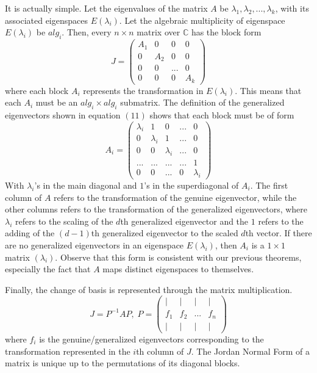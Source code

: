   It is actually simple. Let the eigenvalues of the matrix $A$ be $\lambda_1, \lambda_2, ..., \lambda_k$, with its associated eigenspaces $E(\lambda_i)$. Let the algebraic multiplicity of eigenspace $E(\lambda_i)$ be $alg_i$. Then, every $n \times n$ matrix over $\mathbb{C}$ has the block form 
  \[ J = \begin{pmatrix}
  A_1&0&0&0\\
  0&A_2&0&0\\
  0&0&...&0\\
  0&0&0&A_k
  \end{pmatrix}\]
  where each block $A_i$ represents the transformation in $E(\lambda_i)$. This means that each $A_i$ must be an $alg_i \times alg_i$ submatrix. The definition of the generalized eigenvectors shown in equation $(11)$ shows that each block must be of form 
  \[A_i = \begin{pmatrix}
  \lambda_i & 1 & 0 & ... & 0\\
  0 &\lambda_i & 1 &...&0 \\
  0&0&\lambda_i&...&0\\
  ...&...&...&...&1\\
  0&0&...&0&\lambda_i
  \end{pmatrix}\]
  With $\lambda_i$'s in the main diagonal and $1$'s in the superdiagonal of $A_i$. The first column of $A$ refers to the transformation of the genuine eigenvector, while the other columns refers to the transformation of the generalized eigenvectors, where $\lambda_i$ refers to the scaling of the $d$th generalized eigenvector and the $1$ refers to the adding of the $(d-1)$th generalized eigenvector to the scaled $d$th vector. If there are no generalized eigenvectors in an eigenspace $E(\lambda_i)$, then $A_i$ is a $1 \times 1$ matrix $( \lambda_i )$. Observe that this form is consistent with our previous theorems, especially the fact that $A$ maps distinct eigenspaces to themselves. 

  Finally, the change of basis is represented through the matrix multiplication. 
  \[J = P^{-1} A P, \; P = \begin{pmatrix}
  |&|&|&| \\ 
  f_1&f_2&...&f_n \\
  |&|&|&|
  \end{pmatrix} \]
  where $f_i$ is the genuine/generalized eigenvectors corresponding to the transformation represented in the $i$th column of $J$. The Jordan Normal Form of a matrix is unique up to the permutations of its diagonal blocks. 

